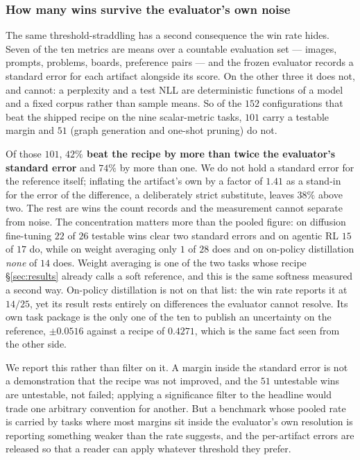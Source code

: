 \subsubsection{How many wins survive the evaluator's own noise}
\label{sec:noise}

The same threshold-straddling has a second consequence the win rate hides. Seven of the ten metrics are
means over a countable evaluation set --- images, prompts, problems, boards, preference pairs --- and
the frozen evaluator records a standard error for each artifact alongside its score. On the other three
it does not, and cannot: a perplexity and a test NLL are deterministic functions of a model and a fixed
corpus rather than sample means. So of the $152$ configurations that beat the shipped recipe on the
nine scalar-metric tasks, $101$ carry a testable margin and $51$ (graph generation and one-shot
pruning) do not.

Of those $101$, \textbf{$42\%$ beat the recipe by more than twice the evaluator's
standard error} and $74\%$ by more than one. We do not hold a standard error for the reference itself;
inflating the artifact's own by a factor of $1.41$ as a stand-in for the error of the difference, a
deliberately strict substitute, leaves $38\%$ above two. The rest are wins the count records and the measurement
cannot separate from noise. The concentration matters more than the pooled figure: on diffusion
fine-tuning $22$ of $26$ testable wins clear two standard errors and on agentic RL $15$ of $17$ do,
while on weight averaging only $1$ of $28$ does and on on-policy distillation \emph{none} of $14$ does.
Weight averaging is one of the two tasks whose recipe \S\ref{sec:results} already
calls a soft reference, and this is the same softness measured a second way. On-policy distillation is
not on that list: the win rate reports it at $14/25$, yet its result rests entirely on differences the
evaluator cannot resolve. Its own task package is the only one
of the ten to publish an uncertainty on the reference, $\pm0.0516$ against a recipe of $0.4271$, which
is the same fact seen from the other side.

We report this rather than filter on it. A margin inside the standard error is not a demonstration that
the recipe was not improved, and the $51$ untestable wins are untestable, not failed; applying a
significance filter to the headline would trade one arbitrary convention for another. But a benchmark
whose pooled rate is carried by tasks where most margins sit inside the evaluator's own resolution is
reporting something weaker than the rate suggests, and the per-artifact errors are released so that a
reader can apply whatever threshold they prefer.

